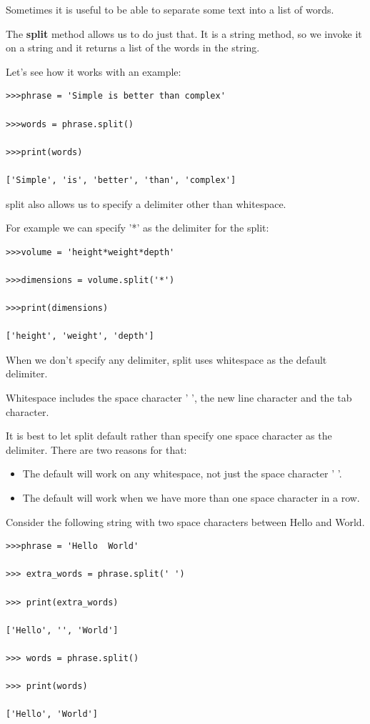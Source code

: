 \documentclass{article}
\begin{document}
Sometimes it is useful to be able to separate some text into a list of words.

The \textbf{split} method allows us to do just that.  It is a string method, so we invoke it on a string and it returns a list of the words in the string.

Let's see how it works with an example:

\begin{lstlisting}
>>>phrase = 'Simple is better than complex'

>>>words = phrase.split()

>>>print(words)

['Simple', 'is', 'better', 'than', 'complex']

\end{lstlisting}

split also allows us to specify a delimiter other than whitespace.

For example we can specify '*' as the delimiter for the split:

\begin{lstlisting}
>>>volume = 'height*weight*depth'

>>>dimensions = volume.split('*')

>>>print(dimensions)

['height', 'weight', 'depth']
\end{lstlisting}

When we don't specify any delimiter, split uses whitespace as the default delimiter.

Whitespace includes the space character ' ', the new line character and the tab character.

It is best to let split default rather than specify one space character as the delimiter.  There are two reasons for that:
\begin{itemize}
\item The default will  work on any whitespace, not just the space character ' '.
\item The default will work when we have more than one space character in a row.
\end{itemize}
  
Consider the following string with two space characters between Hello and World.

\begin{lstlisting}
>>>phrase = 'Hello  World'

>>> extra_words = phrase.split(' ')  

>>> print(extra_words)

['Hello', '', 'World']

>>> words = phrase.split()

>>> print(words)

['Hello', 'World']

\end{lstlisting}
\end{document}
